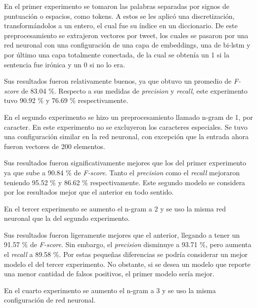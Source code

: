 		\par En el primer experimento se tomaron las palabras separadas por signos de puntuación o espacios, como tokens. A estos se les aplicó una discretización, transformándolos a un entero, el cual fue su índice en un diccionario. De este preprocesamiento se extrajeron vectores por tweet, los cuales se pasaron por una red neuronal con una configuración de una capa de embeddings, una de \gls{bi-lstm} y por último una capa totalmente conectada, de la cual se obtenía un 1 si la sentencia fue irónica y un 0 si no lo era.
		
		\par Sus resultados fueron relativamente buenos, ya que obtuvo un promedio de \textit{F-score} de 83.04 \%. Respecto a sus medidas de \textit{precision} y \textit{recall}, este experimento tuvo 90.92 \% y 76.69 \% respectivamente.
		
		\par En el segundo experimento se hizo un preprocesamiento llamado n-gram de 1, por caracter. En este experimento no se excluyeron los caracteres especiales. Se tuvo una configuración similar en la red neuronal, con excepción que la entrada ahora fueron vectores de 200 elementos. 
		
		\par Sus resultados fueron significativamente mejores que los del primer experimento ya que sube a 90.84 \% de \textit{F-score}. Tanto el \textit{precision} como el \textit{recall} mejoraron teniendo 95.52 \% y 86.62 \% respectivamente. Este segundo modelo se considera por los resultados mejor que el anterior en todo sentido.
		
		\par En el tercer experimento se aumento el n-gram a 2 y se uso la misma red neuronal que la del segundo experimento.
		
		\par Sus resultados fueron ligeramente mejores que el anterior, llegando a tener un 91.57 \% de \textit{F-score}. Sin embargo, el \textit{precision}
		disminuye a 93.71 \%, pero aumenta el \textit{recall} a 89.58 \%. Por estas pequeñas diferencias se podría considerar un mejor modelo el del tercer experimento. No obstante, si se desea un modelo que reporte una menor cantidad de falsos positivos, el primer modelo sería mejor.
		
		\par En el cuarto experimento se aumento el n-gram a 3 y se uso la misma configuración de red neuronal. 
		
